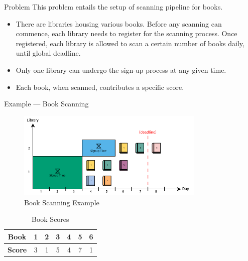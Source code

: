 \begin{frame}{Problem}
  This problem entails the setup of scanning pipeline for books.

  \begin{itemize}
    \item There are libraries housing various books. Before any scanning can commence, each
          library needs to register for the scanning process. Once registered, each
          library is allowed to scan a certain number of books daily, until global deadline.
    \item Only one library can undergo the sign-up process at any given time.
    \item Each book, when scanned, contributes a specific score.
  \end{itemize}

\end{frame}

\begin{frame}{Example --- Book Scanning}
  \begin{figure}[h]
    \centering
    \includegraphics[width=0.8\textwidth,keepaspectratio]{../assets/bs/bs-example-slides.pdf}
    \caption{Book Scanning Example}
  \end{figure}

  \begin{table}[ht]
    \centering
    \begin{tabular}{ccccccc}
      \toprule
      \textbf{Book}  & 1 & 2 & 3 & 4 & 5 & 6 \\ \midrule
      \textbf{Score} & 3 & 1 & 5 & 4 & 7 & 1 \\
      \bottomrule
    \end{tabular}
    \caption{Book Scores}
  \end{table}
\end{frame}

